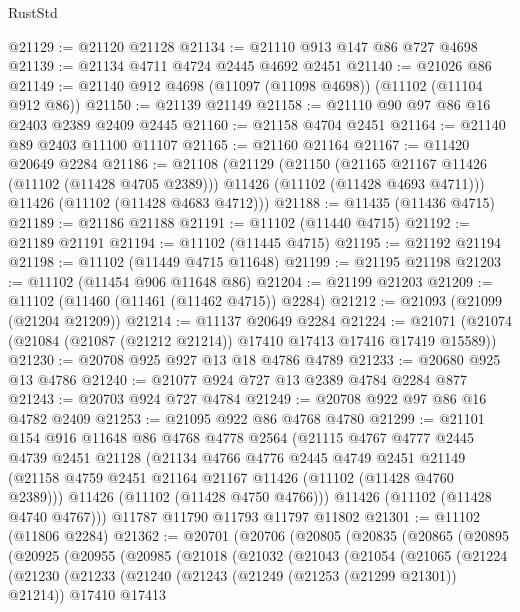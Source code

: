 \begin{lexlean}{RustStd}
\begin{coremodule}
@21129 := @21120 @21128
@21134 := @21110 @913 @147 @86 @727 @4698
@21139 := @21134 @4711 @4724 @2445 @4692 @2451
@21140 := @21026 @86
@21149 := @21140 @912 @4698 (@11097 (@11098 @4698)) (@11102 (@11104 @912 @86))
@21150 := @21139 @21149
@21158 := @21110 @90 @97 @86 @16 @2403 @2389 @2409 @2445
@21160 := @21158 @4704 @2451
@21164 := @21140 @89 @2403 @11100 @11107
@21165 := @21160 @21164
@21167 := @11420 @20649 @2284
@21186 := @21108
    (@21129
      (@21150
        (@21165 @21167 @11426 (@11102 (@11428 @4705 @2389)))
        @11426
        (@11102 (@11428 @4693 @4711)))
      @11426
      (@11102 (@11428 @4683 @4712)))
@21188 := @11435 (@11436 @4715)
@21189 := @21186 @21188
@21191 := @11102 (@11440 @4715)
@21192 := @21189 @21191
@21194 := @11102 (@11445 @4715)
@21195 := @21192 @21194
@21198 := @11102 (@11449 @4715 @11648)
@21199 := @21195 @21198
@21203 := @11102 (@11454 @906 @11648 @86)
@21204 := @21199 @21203
@21209 := @11102 (@11460 (@11461 (@11462 @4715)) @2284)
@21212 := @21093 (@21099 (@21204 @21209))
@21214 := @11137 @20649 @2284
@21224 := @21071 (@21074 (@21084 (@21087 (@21212 @21214)) @17410 @17413 @17416 @17419 @15589))
@21230 := @20708 @925 @927 @13 @18 @4786 @4789
@21233 := @20680 @925 @13 @4786
@21240 := @21077 @924 @727 @13 @2389 @4784 @2284 @877
@21243 := @20703 @924 @727 @4784
@21249 := @20708 @922 @97 @86 @16 @4782 @2409
@21253 := @21095 @922 @86 @4768 @4780
@21299 := @21101
    @154
    @916
    @11648
    @86
    @4768
    @4778
    @2564
    (@21115
      @4767
      @4777
      @2445
      @4739
      @2451
      @21128
      (@21134
        @4766
        @4776
        @2445
        @4749
        @2451
        @21149
        (@21158 @4759 @2451 @21164 @21167 @11426 (@11102 (@11428 @4760 @2389)))
        @11426
        (@11102 (@11428 @4750 @4766)))
      @11426
      (@11102 (@11428 @4740 @4767)))
    @11787
    @11790
    @11793
    @11797
    @11802
@21301 := @11102 (@11806 @2284)
@21362 := @20701
    (@20706
      (@20805
        (@20835
          (@20865
            (@20895
              (@20925
                (@20955
                  (@20985
                    (@21018
                      (@21032
                        (@21043
                          (@21054
                            (@21065
                              (@21224
                                (@21230
                                  (@21233
                                    (@21240
                                      (@21243 (@21249 (@21253 (@21299 @21301)) @21214))
                                      @17410
                                      @17413

\end{coremodule}
\end{lexlean}
